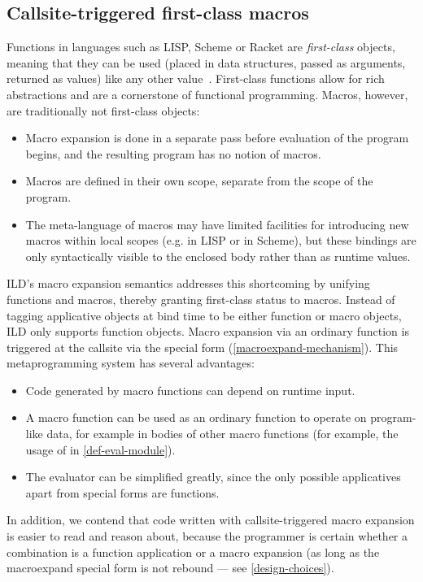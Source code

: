 \subsection{Callsite-triggered first-class macros}
\label{macro-function-duality}
Functions in languages such as LISP, Scheme or Racket are \emph{first-class}
objects, meaning that they can be used (placed in data structures, passed as arguments,
returned as values) like any other value~\cite{kohlbecker1986syntactic,r5rs,racket}.
First-class functions allow for rich abstractions
and are a cornerstone of functional programming. Macros, however,
are traditionally not first-class objects:
\begin{itemize}
\item Macro expansion is done in a separate pass before evaluation of the
program begins, and the resulting program has no notion of macros.
\item Macros are defined in their own scope, separate from the scope
of the program.
\item The meta-language of macros may have limited facilities for
introducing new macros within local scopes (e.g.  in LISP or
 in Scheme), but these bindings are only syntactically visible
to the enclosed body rather than as runtime values.
\end{itemize}
ILD's macro expansion semantics addresses this shortcoming by unifying functions
and macros, thereby granting first-class status to macros.
Instead of tagging applicative objects at bind time to be either
function or macro objects, ILD only supports function objects. Macro expansion via an
ordinary function is triggered at the callsite via the 
special form (\cref{macroexpand-mechanism}).
This metaprogramming system has several advantages:
\begin{itemize}
\item Code generated by macro functions can depend on runtime input.
\item A macro function can be used as an ordinary function to operate on
program-like data, for example in bodies of other macro functions (for example,
the usage of  in \cref{def-eval-module}).
\item The evaluator can be simplified greatly, since the only possible applicatives apart
from special forms are functions.
\end{itemize}
In addition, we contend that code written with callsite-trig\-gered %
macro expansion is easier to read and reason about, because the programmer
is certain whether a combination is a function application or a macro expansion
(as long as the macroexpand special form is not rebound --- see \cref{design-choices}).

